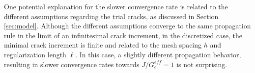 One potential explanation for the slower convergence rate is related to the different assumptions regarding the trial cracks, as discussed in Section \ref{sec:model}. Although the different assumptions converge to the same propagation rule in the limit of an infinitesimal crack increment, in the discretized case, the minimal crack increment is finite and related to the mesh spacing $h$ and regularization length $\ell$. In this case, a slightly different propagation behavior, resulting in slower convergence rates towards $J/G^{eff}_c = 1$ is not surprising. 
